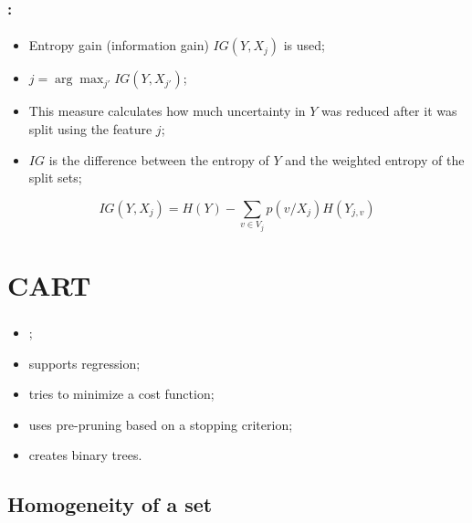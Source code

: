 \documentclass[xcolor=table]{beamer}
\begin{document}
\begin{frame}
	\frametitle{\insertshortsubtitle: \insertsection}
	\framesubtitle{\insertsubsection}
	
	\begin{itemize}
		\item Entropy gain (information gain) $IG(Y, X_j)$ is used;
		\item $j = \arg\max_{j'} IG(Y, X_{j'})$;
		\item This measure calculates how much uncertainty in $Y$ was reduced after it was split using the feature $j$;
		\item $ IG $ is the difference between the entropy of $Y$ and the weighted entropy of the split sets;
	\end{itemize}

	\[IG(Y, X_j) = H(Y) - \sum_{v \in V_j} p(v/X_j) H(Y_{j, v})\]
	
	
\end{frame}

\section{CART}

\begin{frame}
	\frametitle{\insertshortsubtitle}
	\framesubtitle{\insertsection}
	\begin{itemize}
		\item {};
		\item supports regression;
		\item tries to minimize a cost function;
		\item uses pre-pruning based on a stopping criterion;
		\item creates binary trees.
	\end{itemize}
	
\end{frame}

\subsection{Homogeneity of a set}
\end{document}
